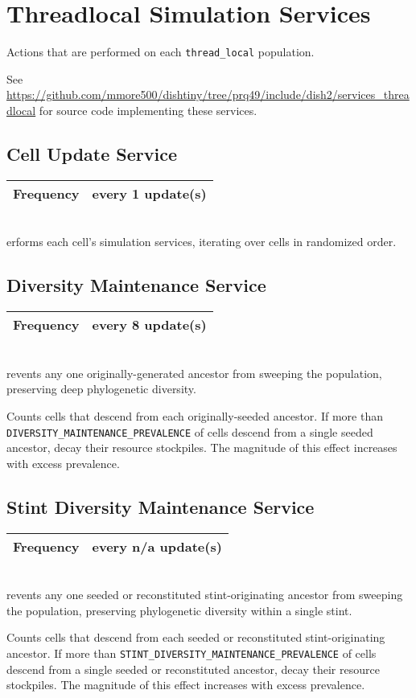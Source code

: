 \newcommand{\threadlocalsimservicedef}[2]{
    \begin{tabular}{|
        >{\columncolor[HTML]{C0C0C0}}l |l|}
        \hline
        Frequency & every #1 update(s) \\ \hline
    \end{tabular} \\
}

\section{Threadlocal Simulation Services}

Actions that are performed on each \texttt{thread\_local} population.

See \url{https://github.com/mmore500/dishtiny/tree/prq49/include/dish2/services_threadlocal} for source code implementing these services. 

\subsection{Cell Update Service}

\threadlocalsimservicedef{1}

Performs each cell's simulation services, iterating over cells in randomized order.

\subsection{Diversity Maintenance Service}

\threadlocalsimservicedef{8}

Prevents any one originally-generated ancestor from sweeping the population, preserving deep phylogenetic diversity.

Counts cells that descend from each originally-seeded ancestor.
If more than \texttt{DIVERSITY\_MAINTENANCE\_PREVALENCE} of cells descend from a single seeded ancestor, decay their resource stockpiles.
The magnitude of this effect increases with excess prevalence.

\subsection{Stint Diversity Maintenance Service}

\threadlocalsimservicedef{n/a}

Prevents any one seeded or reconstituted stint-originating ancestor from sweeping the population, preserving phylogenetic diversity within a single stint.

Counts cells that descend from each seeded or reconstituted stint-originating ancestor.
If more than \texttt{STINT\_DIVERSITY\_MAINTENANCE\_PREVALENCE} of cells descend from a single seeded or reconstituted ancestor, decay their resource stockpiles.
The magnitude of this effect increases with excess prevalence.